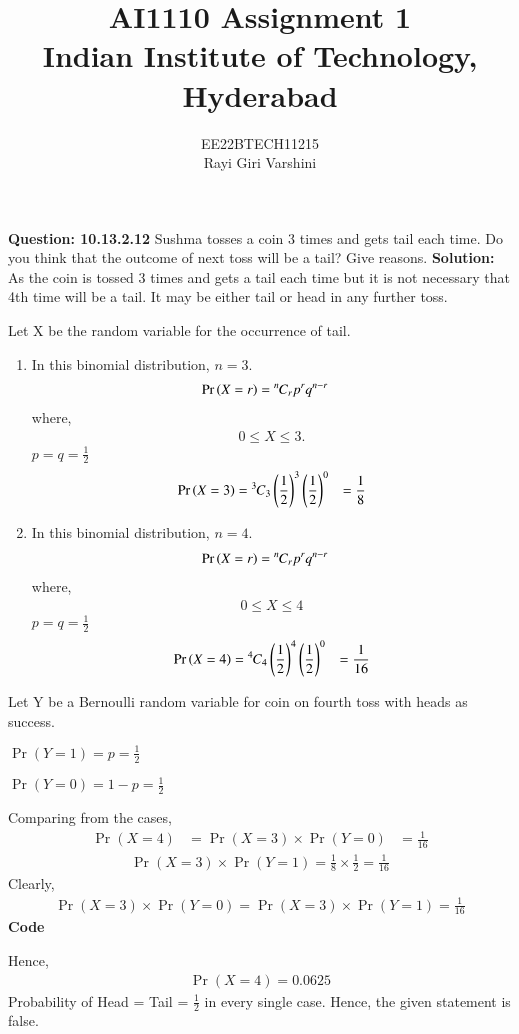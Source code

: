 \documentclass[journal,12pt,twocolumn]{IEEEtran}
\title{
AI1110 Assignment 1\\
  \Large Indian Institute of Technology, Hyderabad
}
\author{
  EE22BTECH11215\\[4pt]
  Rayi Giri Varshini\\  
}
\providecommand{\pr}[1]{\ensuremath{\Pr\left(#1\right)}}
\providecommand{\brak}[1]{\ensuremath{\left(#1\right)}}
\theoremstyle{remark}
\newcommand{\permcomb}[4][0mu]{{{}^{#3}\mkern#1#2_{#4}}}
\newcommand{\comb}[1][-1mu]{\permcomb[#1]{C}}
\begin{document}
%
\maketitle
\textbf{Question: 10.13.2.12} 
Sushma tosses a coin 3 times and gets tail each time. Do you think that the outcome of next toss will be a tail? Give reasons.
\textbf{Solution: }As the coin is tossed 3 times and gets a tail each time but it is not necessary that 4th time will be a tail. It may be either tail or head in any further toss.

Let X be the random variable for the occurrence of tail.
\begin{enumerate}[label=(\roman*)]
\item In this binomial distribution, $n = 3$.
\begin{align} \pr{X=r} &= \comb{n}{r} p^{r}q^{n-r} \end{align} where, \begin{align} 0 \le X \le 3. 
\end{align}
  $p = q = \frac{1}{2}$ 
\begin{align} \pr{X=3} &= \comb{3}{3}  \brak{\frac{1}{2}}^{3} \brak{\frac{1}{2}}^{0} &= \frac{1}{8} \end{align}
\item In this binomial distribution, $n = 4$.
\begin{align} \pr{X=r} &= \comb{n}{r} p^{r}q^{n-r} \end{align} where, \begin{align} 0 \le X \le 4 \end{align}
  $p = q = \frac{1}{2}$
\begin{align} \pr{X=4} &= \comb{4}{4}  \brak{\frac{1}{2}}^{4} \brak{\frac{1}{2}}^{0} &= \frac{1}{16} \end{align}
\end{enumerate}
Let Y be a Bernoulli random variable for coin on fourth toss with heads as success.

$ \pr{Y=1} = p = \frac{1}{2} $

$ \pr{Y=0} = 1-p = \frac{1}{2} $

Comparing from the cases, 
\begin{align} \pr{X=4} &= \pr{X=3} \times \pr{Y=0} &= \frac{1}{16} \end{align}
\begin{align} \pr{X=3} \times \pr{Y=1} = \frac{1}{8} \times \frac{1}{2} = \frac{1}{16} \end{align}
Clearly, \begin{align} \pr{X=3} \times \pr{Y=0} = \pr{X=3} \times \pr{Y=1} = \frac{1}{16} \end{align}
\textbf{Code}

Hence, \begin{align} \pr{X = 4} = 0.0625 \end{align}
Probability of Head = Tail = $ \frac{1}{2} $ in every single case.
Hence, the given statement is false.
\end{document}
